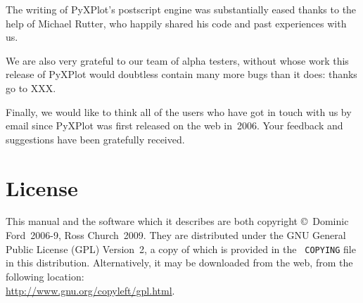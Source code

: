 The writing of PyXPlot's postscript engine was substantially eased thanks to
the help of Michael Rutter, who happily shared his code and past experiences
with us.

We are also very grateful to our team of alpha testers, without whose work this
release of PyXPlot would doubtless contain many more bugs than it does: thanks
go to XXX.

Finally, we would like to think all of the users who have got in touch with us
by email since PyXPlot was first released on the web in~2006. Your feedback and
suggestions have been gratefully received.

\section{License}

This manual and the software which it describes are both copyright \copyright\
Dominic Ford~2006-9, Ross Church~2009. They are distributed under the GNU
General Public License (GPL) Version~2, a copy of which is provided in the {\tt
COPYING} file in this distribution. Alternatively, it may be downloaded from the web, from
the following location:\\ \url{http://www.gnu.org/copyleft/gpl.html}.

